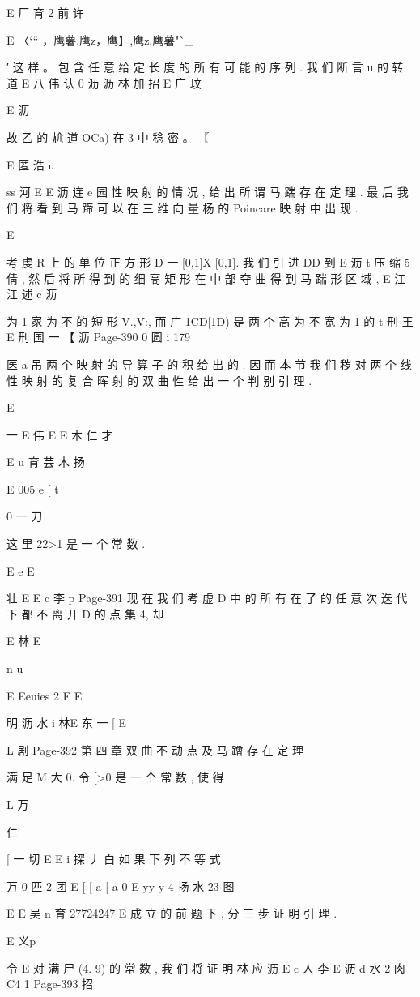{{{{{{{{{{{{{E 厂 育 2 前 许

E 〈`“ ，鹰薯,鹰z，鹰】,鹰z,鹰薯"`_}′
这 样 。 包 含 任 意 给 定 长 度 的 所 有 可 能 的 序 列 . 我 们 断 言 u 的 转 道
E 八 伟 认 0 沥 沥 林 加 招
E 广
玟

E 沥

故 乙 的 尬 道 OCa) 在 3 中 稔 密 。 〖

E 匿 浩 u

ss 河
E
E 沥 连 e
园
性 映 射 的 情 况 , 给 出 所 谓 马 踹 存 在 定 理 . 最 后 我 们 将 看 到 马 蹄 可 以
在 三 维 向 量 杨 的 Poincare 映 射 中 出 现 .

E

考 虔 R 上 的 单 位 正 方 形 D 一 [0,1]X [0,1]. 我 们 引 进 DD 到
E 沥 t
压 缩 5 倩 , 然 后 将 所 得 到 的 细 高 矩 形 在 中 部 夺 曲 得 到 马 踹 形 区 域 ,
E 江江 述 c 沥

为 1 家 为 不 的 短 形 V.,V:, 而 广 1CD[1D) 是 两 个 高 为 不 宽 为 1 的
t 刑
王
E 刑 国 一
【 沥
Page-390
0 圆 i 179

医 a 吊
两 个 映 射 的 导 算 子 的 积 给 出 的 . 因 而 本 节 我 们 秽 对 两 个 线 性 映 射
的 复 合 晖 射 的 双 曲 性 给 出 一 个 判 别 引 理 .

E

一
E 伟
E
E 木 仁 才

E u 育 芸 木 扬

E
005 e
[ t

0 一 刀

这 里 22>1 是 一 个 常 数 .

E e
E

壮
E
E c 李 p
Page-391
现 在 我 们 考 虚 D 中 的 所 有 在 了 的 任 意 次 迭 代 下 都 不 离 开 D
的 点 集 4, 却

E 林
E

n
u

E
Eeuies 2 E
E

明 沥 水 i 林E 东 一 [
E

L 剧
Page-392
第 四 章 双 曲 不 动 点 及 马 蹭 存 在 定 理

满 足 M 大 0. 令 [>0 是 一 个 常 数 , 使 得

L 万

仁

[ 一 切 E
E i 探 丿 白
如 果 下 列 不 等 式

万 0
匹 2 团 E
[ [
a [
a 0
E yy y 4 扬 水 23 图

E
E 吴 n 育 27724247
E
成 立 的 前 题 下 , 分 三 步 证 明 引 理 .

E 义p

令
E
对 满 尸 (4. 9) 的 常 数 , 我 们 将 证 明
林 应 沥
E
c 人 李
E 沥
d 水 2 肉
C4 1
Page-393
招

}}}}}}}}}}}}
